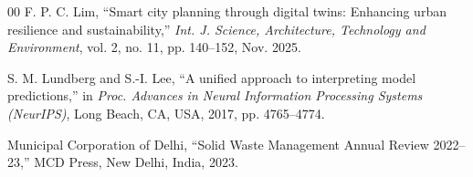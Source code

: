 \documentclass[conference]{IEEEtran}
\begin{document}
\begin{thebibliography}{00}
F. P. C. Lim, ``Smart city planning through digital twins: Enhancing
urban resilience and sustainability,''
\textit{Int. J. Science, Architecture, Technology and Environment},
vol. 2, no. 11, pp. 140--152, Nov. 2025.

S. M. Lundberg and S.-I. Lee, ``A unified approach to interpreting
model predictions,'' in \textit{Proc. Advances in Neural Information
Processing Systems (NeurIPS)}, Long Beach, CA, USA, 2017, pp.
4765--4774.

Municipal Corporation of Delhi, ``Solid Waste Management Annual Review
2022--23,'' MCD Press, New Delhi, India, 2023.

\end{thebibliography}
\end{document}
